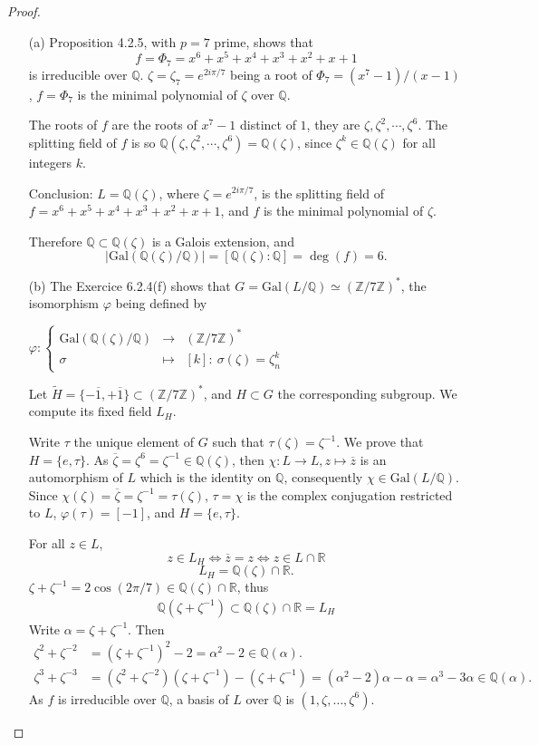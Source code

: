 \documentclass[11pt,a4paper]{article}
\newcommand{\Q}{\mathbb{Q}}
\newcommand{\Z}{\mathbb{Z}}
\newcommand{\R}{\mathbb{R}}
\newcommand{\Gal}{\mathrm{Gal}}
\begin{document}
\begin{proof}
\begin{enumerate}
\item[(a)]
Proposition 4.2.5, with $p=7$ prime, shows that $$f = \Phi_7 = x^6+x^5+x^4+x^3+x^2+x+1$$ is irreducible over $\Q$.
$\zeta = \zeta_7 = e^{2i\pi/7}$ being a root of $\Phi_7 = (x^7-1)/(x-1)$, $f=\Phi_7$ is the minimal polynomial of  $\zeta$ over $\Q$.

The roots of $f$ are the roots of $x^7-1$ distinct of $1$, they are $\zeta, \zeta^2,\cdots,\zeta^6$. The splitting field of $f$ is so $\Q(\zeta, \zeta^2,\cdots,\zeta^6) = \Q(\zeta)$, since $\zeta^k \in \Q(\zeta)$ for all integers $k$.

Conclusion: 
$L = \Q(\zeta)$, where $\zeta =  e^{2i\pi/7}$, is the splitting field of $f = x^6+x^5+x^4+x^3+x^2+x+1$, and $f$ is the minimal polynomial of $\zeta$.

Therefore $\Q \subset \Q(\zeta)$ is a Galois extension, and
$$\vert \Gal(\Q(\zeta)/\Q)\vert = [\Q(\zeta):\Q] = \deg(f) = 6.$$

\item[(b)]
The Exercice 6.2.4(f) shows that $G = \Gal(L/\Q) \simeq (\Z/7\Z)^*$, the isomorphism $\varphi$ being defined by
\begin{center}
$
\varphi : 
\left\{
\begin{array}{ccc}
 \Gal(\Q(\zeta)/\Q) &  \to  & ( \Z/7\Z)^* \\
  \sigma &  \mapsto  &  [k] : \ \sigma(\zeta) = \zeta_n^k
\end{array}
\right.
$
\end{center} 
Let $\tilde{H} = \{-\overline{1},+\overline{1}\} \subset (\Z/7\Z)^*$, and $H \subset G$ the corresponding subgroup.  We compute its fixed field $L_H$.

Write $\tau$ the unique element of $G$ such that $\tau(\zeta) = \zeta^{-1}$. We prove that $H = \{e,\tau\}$.
As $\overline{\zeta} = \zeta^6 = \zeta^{-1} \in \Q(\zeta)$, then  $\chi : L \to L, z \mapsto \overline{z}$ is an automorphism of $L$ which is the identity on $\Q$, consequently $\chi \in \Gal(L/\Q)$. Since $\chi(\zeta) = \overline{\zeta} = \zeta^{-1} = \tau(\zeta)$, $\tau = \chi$ is the complex conjugation restricted to $L$, $\varphi(\tau) = [-1]$, and $H = \{e, \tau\}$.

For all $z \in L$,
$$z \in L_H \iff \overline{z} = z \iff z\in L\cap \R$$ 
$$L_H = \Q(\zeta) \cap \R.$$
$\zeta+\zeta^{-1} = 2\cos(2\pi/7) \in  \Q(\zeta) \cap \R$, thus
\begin{align}
\Q(\zeta+\zeta^{-1}) \subset \Q(\zeta) \cap \R = L_H
\end{align}
Write $\alpha = \zeta+\zeta^{-1}$. Then
\begin{align*}
\zeta^2 + \zeta^{-2} &= (\zeta+\zeta^{-1})^2 - 2 = \alpha^2-2 \in \Q(\alpha).\\
\zeta^3+\zeta^{-3} &= (\zeta^2+\zeta^{-2})(\zeta+\zeta^{-1}) - (\zeta+\zeta^{-1})=(\alpha^2-2) \alpha - \alpha = \alpha^3 - 3 \alpha \in \Q(\alpha).
\end{align*}
As $f$ is irreducible over $\Q$, a basis of $L$ over $\Q$ is $(1,\zeta,\ldots,\zeta^6)$.


\end{enumerate}
\end{proof}
\end{document}
